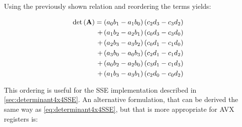 Using the previously shown relation and reordering the terms yields:

\begin{align}
\mathrm{det}\left(\mathbf{A}\right)
= \left(a_0b_1 - a_1b_0\right) \left(c_2d_3 - c_3d_2\right)\nonumber\\
+ \left(a_1b_2 - a_2b_1\right) \left(c_0d_3 - c_3d_0\right)\nonumber\\
+ \left(a_2b_3 - a_3b_2\right) \left(c_0d_1 - c_1d_0\right)\nonumber\\
+ \left(a_3b_0 - a_0b_3\right) \left(c_2d_1 - c_1d_2\right)\nonumber\\
+ \left(a_0b_2 - a_2b_0\right) \left(c_3d_1 - c_1d_3\right)\nonumber\\
+ \left(a_1b_3 - a_3b_1\right) \left(c_2d_0 - c_0d_2\right)\label{eq:determinant4x4SSE}
\end{align}

This ordering is useful for the SSE implementation described in \cref{sec:determinant4x4SSE}. 
An alternative formulation, that can be derived the same way as \cref{eq:determinant4x4SSE}, but that is more appropriate for AVX registers is:   

\begin{comment}

\begin{align*}
a_0c_1 \pth{b_3d_2 - b_2d_3}
+ a_0c_2 \pth{b_1d_3 - b_3d_1}            
+ a_0c_3 \pth{b_2d_1 - b_1d_2}\\
+ a_1c_0 \pth{b_2d_3 - b_3d_2}
+ a_1c_2 \pth{b_3d_0 - b_0d_3}
+ a_1c_3 \pth{b_0d_2 - b_2d_0}\\
+ a_2c_0 \pth{b_3d_1 - b_1d_3}
+ a_2c_1 \pth{b_0d_3 - b_3d_0}
+ a_2c_3 \pth{b_1d_0 - b_0d_1}\\
+ a_3c_0 \pth{b_1d_2 - b_2d_1}
+ a_3c_1 \pth{b_2d_0 - b_0d_2}
+ a_3c_2 \pth{b_0d_1 - b_1d_0}
\end{align*}

\begin{align*}
\pth{a_0c_1 - a_1c_0} \pth{b_3d_2 - b_2d_3} \\
+ \pth{a_0c_2 - a_2c_0} \pth{b_1d_3 - b_3d_1} \\
+ \pth{a_0c_3 - a_3c_0} \pth{b_2d_1 - b_1d_2} \\
+ \pth{a_1c_2 - a_2c_1} \pth{b_3d_0 - b_0d_3} \\
+ \pth{a_1c_3 - a_3c_1} \pth{b_0d_2 - b_2d_0} \\ 
+ \pth{a_2c_3 - a_3c_2} \pth{b_1d_0 - b_0d_1} \\ 
\end{align*}
\end{comment}

